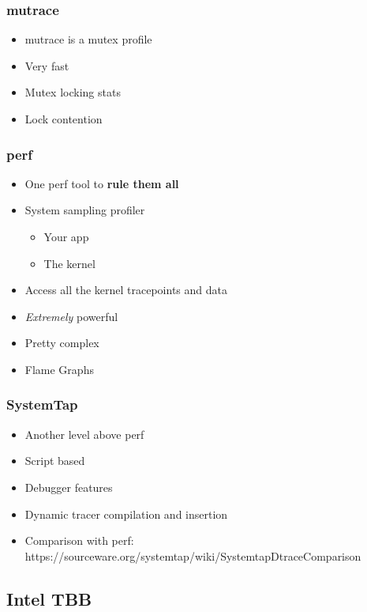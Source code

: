 \begin{frame}
  \frametitle{mutrace}

  \begin{itemize}
  \item mutrace is a mutex profile
  \item Very fast
  \item Mutex locking stats
  \item Lock contention
  \end{itemize}
\end{frame}


\begin{frame}
  \frametitle{perf}

  \begin{itemize}
  \item One perf tool to \textbf{rule them all}
  \item System sampling profiler
    \begin{itemize}
    \item Your app
    \item The kernel
    \end{itemize}
  \item Access all the kernel tracepoints and data
  \item \emph{Extremely} powerful
  \item Pretty complex
  \item Flame Graphs
  \end{itemize}
\end{frame}


\begin{frame}
  \frametitle{SystemTap}

  \begin{itemize}
  \item Another level above perf
  \item Script based
  \item Debugger features
  \item Dynamic tracer compilation and insertion
  \item Comparison with perf: https://sourceware.org/systemtap/wiki/SystemtapDtraceComparison
  \end{itemize}
\end{frame}


\subsection{Intel TBB}
\label{subsec:tbb}

